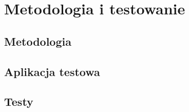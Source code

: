 \chapter{Metodologia i testowanie}

\section{Metodologia}

\section{Aplikacja testowa}

\section{Testy}
